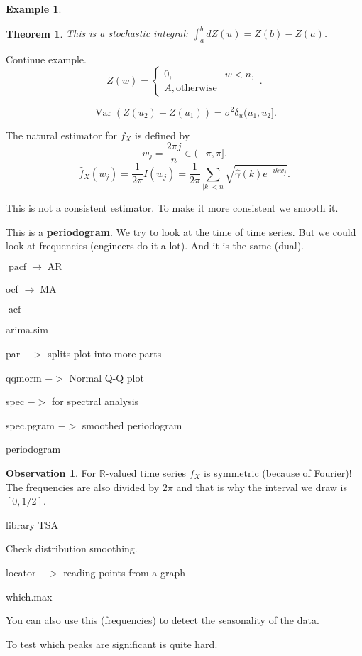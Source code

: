 \documentclass[12pt,a4paper, notitlepage]{book}
\theoremstyle{definition} %
\newtheorem{example}{Example}[chapter]
\newtheorem*{observation}{Observation}
\theoremstyle{plain} %
\newtheorem{theorem}{Theorem}
\newcommand{\R}{\mathbb R}
\DeclareMathOperator{\Var}{Var}
\DeclareMathOperator{\Acf}{acf}
\DeclareMathOperator{\Pacf}{pacf}
\DeclareMathOperator{\Ar}{AR}
\DeclareMathOperator{\Ma}{MA}
\begin{document}
\begin{example}
\begin{theorem}
This is a stochastic integral:
$\int_a^bdZ(u) = Z(b) - Z(a)$.
\end{theorem}

Continue example.
\[ Z(w) = \begin{cases} 0,  & w < n , \\ A , \text{otherwise} \end{cases} . \] 

\[ \Var(Z(u_2) - Z(u_1)) = \sigma^2 \delta_u(u_1, u_2]. \]

The natural estimator for $f_X$ is defined by 
\[ w_j = \frac{2 \pi j}{n} \in (-\pi, \pi]. \]
\[ \hat{f}_X(w_j) =\frac{1}{2\pi} I(w_j)= \frac{1}{2\pi} \sum_{|k| < n} \sqrt{\hat{\gamma}(k)e^{-ikw_j}} . \]

This is not a consistent estimator. To make it more consistent we smooth it. 

This is a {\bf periodogram}. We try to look at the time of time series. But we could look at frequencies (engineers do it a lot). And it is the same (dual). 
\end{example}









$ \Pacf \to \Ar $

ocf  $\to  \Ma $

$\Acf $

arima.sim

par $->$ splits plot into more parts

qqmorm $->$ Normal Q-Q plot

spec $->$ for spectral analysis

spec.pgram $->$ smoothed periodogram

periodogram

\begin{observation}
For $\R$-valued time series $f_X$ is symmetric (because of Fourier)! The frequencies are also divided by $2 \pi$ and that is why the interval we draw is $[0, 1/2]$.
\end{observation}

library TSA

Check distribution smoothing. 

locator $->$ reading points from a graph

which.max

You can also use this (frequencies) to detect the seasonality of the data.

To test which peaks are significant is quite hard. 
\end{document}

